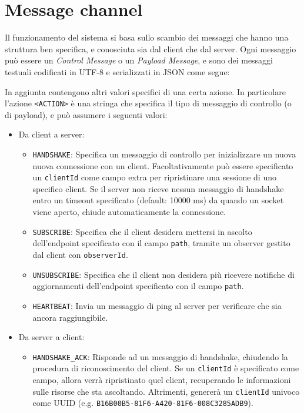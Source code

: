 \documentclass[12pt,a4paper,openright,twoside]{report}
\begin{document}
\section{Message channel}
Il funzionamento del sistema si basa sullo scambio dei messaggi che hanno una struttura ben specifica, e conosciuta sia dal client che dal server. Ogni messaggio può essere un \textit{Control Message} o un \textit{Payload Message}, e sono dei messaggi testuali codificati in UTF-8 e serializzati in JSON come segue:

In aggiunta contengono altri valori specifici di una certa azione. In particolare l'azione \lstinline{<ACTION>} è una stringa che specifica il tipo di messaggio di controllo (o di payload), e può assumere i seguenti valori:
\begin{itemize}
\item Da client a server:
  \begin{itemize}
  \item \lstinline{HANDSHAKE}: Specifica un messaggio di controllo per inizializzare un nuova nuova connessione con un client. Facoltativamente può essere specificato un \lstinline{clientId} come campo extra per ripristinare una sessione di uno specifico client. Se il server non riceve nessun messaggio di handshake entro un timeout specificato (default: 10000 ms) da quando un socket viene aperto, chiude automaticamente la connessione.
  \item \lstinline{SUBSCRIBE}: Specifica che il client desidera mettersi in ascolto dell'endpoint specificato con il campo \lstinline{path}, tramite un observer gestito dal client con \lstinline{observerId}.
  \item \lstinline{UNSUBSCRIBE}: Specifica che il client non desidera più ricevere notifiche di aggiornamenti dell'endpoint specificato con il campo \lstinline{path}.
  \item \lstinline{HEARTBEAT}: Invia un messaggio di ping al server per verificare che sia ancora raggiungibile.
  \end{itemize}
\item Da server a client:
  \begin{itemize}
  \item \lstinline{HANDSHAKE_ACK}: Risponde ad un messaggio di handshake, chiudendo la procedura di riconoscimento del client. Se un \lstinline{clientId} è specificato come campo, allora verrà ripristinato quel client, recuperando le informazioni sulle risorse che sta ascoltando. Altrimenti, genererà un \lstinline{clientId} univoco come UUID (e.g. \lstinline{B16B00B5-81F6-A420-81F6-008C3285ADB9}).

\end{itemize}
\end{itemize}
\end{document}
